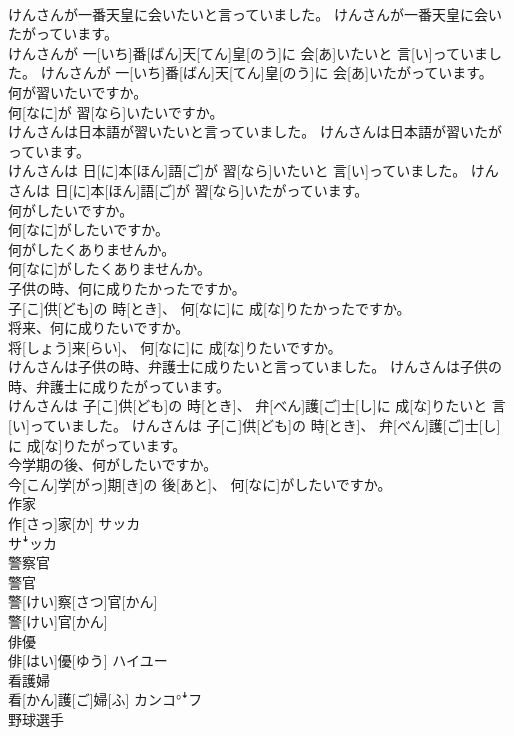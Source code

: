 \documentclass[8pt]{extreport}
\begin{document}
\begin{CJK}{UTF8}{min}
\\	けんさんが一番天皇に会いたいと言っていました。 けんさんが一番天皇に会いたがっています。	
\\	けんさんが 一[いち]番[ばん]天[てん]皇[のう]に 会[あ]いたいと 言[い]っていました。 けんさんが 一[いち]番[ばん]天[てん]皇[のう]に 会[あ]いたがっています。
\\	何が習いたいですか。	
\\	何[なに]が 習[なら]いたいですか。
\\	けんさんは日本語が習いたいと言っていました。 けんさんは日本語が習いたがっています。	
\\	けんさんは 日[に]本[ほん]語[ご]が 習[なら]いたいと 言[い]っていました。 けんさんは 日[に]本[ほん]語[ご]が 習[なら]いたがっています。
\\	何がしたいですか。	
\\	何[なに]がしたいですか。
\\	何がしたくありませんか。	
\\	何[なに]がしたくありませんか。
\\	子供の時、何に成りたかったですか。	
\\	子[こ]供[ども]の 時[とき]、 何[なに]に 成[な]りたかったですか。
\\	将来、何に成りたいですか。	
\\	将[しょう]来[らい]、 何[なに]に 成[な]りたいですか。
\\	けんさんは子供の時、弁護士に成りたいと言っていました。 けんさんは子供の時、弁護士に成りたがっています。	
\\	けんさんは 子[こ]供[ども]の 時[とき]、 弁[べん]護[ご]士[し]に 成[な]りたいと 言[い]っていました。 けんさんは 子[こ]供[ども]の 時[とき]、 弁[べん]護[ご]士[し]に 成[な]りたがっています。
\\	今学期の後、何がしたいですか。	
\\	今[こん]学[がっ]期[き]の 後[あと]、 何[なに]がしたいですか。
\\	作家	
\\	作[さっ]家[か]	サッカ 
\\	サꜜッカ
\\	警察官 
\\	警官	
\\	警[けい]察[さつ]官[かん] 
\\	警[けい]官[かん]	
\\	俳優	
\\	俳[はい]優[ゆう]	ハイユー
\\	看護婦	
\\	看[かん]護[ご]婦[ふ]	カンコ°ꜜフ
\\	野球選手	

\end{CJK}
\end{document}
